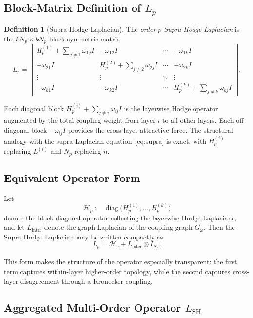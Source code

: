 \documentclass[11pt]{article}
\theoremstyle{definition}
\newtheorem{definition}[theorem]{Definition}
\theoremstyle{remark}
\newcommand{\Gom}{G_\omega}
\DeclareMathOperator{\diag}{diag}
\begin{document}
\subsection{Block-Matrix Definition of $L_p$}

\begin{definition}[Supra-Hodge Laplacian]
\label{def:main}
The \emph{order-$p$ Supra-Hodge Laplacian} is the $kN_p\times kN_p$
block-symmetric matrix
\begin{equation}
  \label{eq:Lp}
  L_p =
  \begin{bmatrix}
    H_p^{(1)} + \textstyle\sum_{j\neq 1}\omega_{1j}I & -\omega_{12}I & \cdots & -\omega_{1k}I\\
    -\omega_{21}I & H_p^{(2)} + \textstyle\sum_{j\neq 2}\omega_{2j}I & \cdots & -\omega_{2k}I\\
    \vdots & \vdots & \ddots & \vdots\\
    -\omega_{k1}I & -\omega_{k2}I & \cdots & H_p^{(k)} + \textstyle\sum_{j\neq k}\omega_{kj}I
  \end{bmatrix}.
\end{equation}
\end{definition}

Each diagonal block $H_p^{(i)}+\sum_{j\neq i}\omega_{ij}I$ is the layerwise
Hodge operator augmented by the total coupling weight from layer $i$ to all
other layers. Each off-diagonal block $-\omega_{ij}I$ provides the cross-layer
attractive force. The structural analogy with the supra-Laplacian
equation~\eqref{eq:supra} is exact, with $H_p^{(i)}$ replacing $L^{(i)}$ and
$N_p$ replacing $n$.

\subsection{Equivalent Operator Form}

Let
\[
\mathcal{H}_p := \diag\!\bigl(H_p^{(1)},\dots,H_p^{(k)}\bigr)
\]
denote the block-diagonal operator collecting the layerwise Hodge Laplacians, and let $L_{\mathrm{inter}}$ denote the graph Laplacian of the coupling graph $\Gom$. Then the Supra-Hodge Laplacian may be written compactly as
\[
L_p = \mathcal{H}_p + L_{\mathrm{inter}} \otimes I_{N_p}.
\]

This form makes the structure of the operator especially transparent: the first term captures within-layer higher-order topology, while the second captures cross-layer disagreement through a Kronecker coupling.

\subsection{Aggregated Multi-Order Operator $L_{\mathrm{SH}}$}
\end{document}
